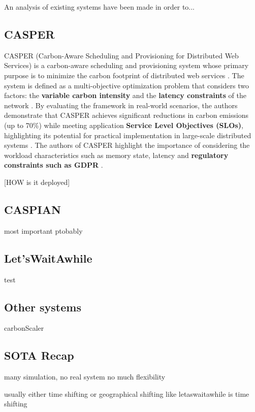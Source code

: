 An analysis of existing systems have been made in order to...

\subsection{CASPER}

CASPER (Carbon-Aware Scheduling and Provisioning for Distributed Web Services) is a carbon-aware scheduling and provisioning system whose primary purpose is to minimize the carbon footprint of distributed web services \cite{Souza_2023}.
The system is defined as a multi-objective optimization problem that considers two factors: the \textbf{variable carbon intensity} and the \textbf{latency constraints} of the network \cite{Souza_2023}.
By evaluating the framework in real-world scenarios, the authors demonstrate that CASPER achieves significant reductions in carbon emissions (up to 70\%) while meeting application \textbf{Service Level Objectives (SLOs)}, highlighting its potential for practical implementation in large-scale distributed systems \cite{Souza_2023}.
The authors of CASPER highlight the importance of considering the workload characteristics such as memory state, latency and \textbf{regulatory constraints such as GDPR} \cite{Souza_2023}.


[HOW is it deployed]



\subsection{CASPIAN}

most important ptobably




\subsection{Let'sWaitAwhile}

test





\subsection{Other systems}

carbonScaler




\subsection{SOTA Recap}

many simulation, no real system
no much flexibility



usually either time shifting or geographical shifting
like letaswaitawhile is time shifting


\newpage
